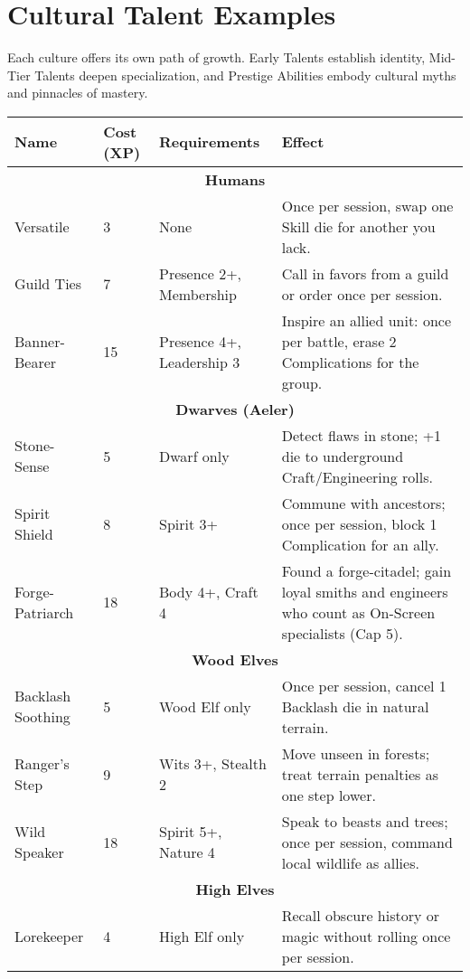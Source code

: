 \documentclass[12pt]{article}
\begin{document}
\section{Cultural Talent Examples}

Each culture offers its own path of growth. Early Talents establish identity, Mid-Tier Talents deepen specialization, and Prestige Abilities embody cultural myths and pinnacles of mastery.

\begin{table}[h]
\centering
\renewcommand{\arraystretch}{1.3}
\begin{tabular}{|p{3cm}|p{2cm}|p{3cm}|p{6cm}|}
\hline
\textbf{Name} & \textbf{Cost (XP)} & \textbf{Requirements} & \textbf{Effect} \\
\hline
\multicolumn{4}{|c|}{\textbf{Humans}} \\
\hline
Versatile & 3 & None & Once per session, swap one Skill die for another you lack. \\
Guild Ties & 7 & Presence 2+, Membership & Call in favors from a guild or order once per session. \\
Banner-Bearer & 15 & Presence 4+, Leadership 3 & Inspire an allied unit: once per battle, erase 2 Complications for the group. \\
\hline
\multicolumn{4}{|c|}{\textbf{Dwarves (Aeler)}} \\
\hline
Stone-Sense & 5 & Dwarf only & Detect flaws in stone; +1 die to underground Craft/Engineering rolls. \\
Spirit Shield & 8 & Spirit 3+ & Commune with ancestors; once per session, block 1 Complication for an ally. \\
Forge-Patriarch & 18 & Body 4+, Craft 4 & Found a forge-citadel; gain loyal smiths and engineers who count as On-Screen specialists (Cap 5). \\
\hline
\multicolumn{4}{|c|}{\textbf{Wood Elves}} \\
\hline
Backlash Soothing & 5 & Wood Elf only & Once per session, cancel 1 Backlash die in natural terrain. \\
Ranger’s Step & 9 & Wits 3+, Stealth 2 & Move unseen in forests; treat terrain penalties as one step lower. \\
Wild Speaker & 18 & Spirit 5+, Nature 4 & Speak to beasts and trees; once per session, command local wildlife as allies. \\
\hline
\multicolumn{4}{|c|}{\textbf{High Elves}} \\
\hline
Lorekeeper & 4 & High Elf only & Recall obscure history or magic without rolling once per session. \\

\end{tabular}
\end{table}
\end{document}
